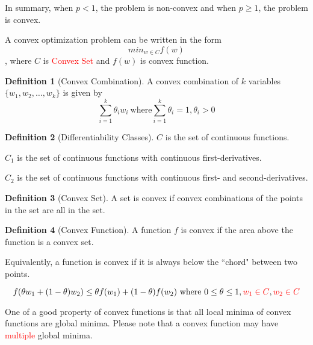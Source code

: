 \documentclass{article}
\theoremstyle{definition}
\newtheorem{definition}{Definition}[section]
\theoremstyle{remark}
\newcommand{\red}[1]{\textcolor{red}{#1}}
\begin{document}
In summary, when $p < 1$, the problem is non-convex and when $p \geq 1$, the problem is convex.

A convex optimization problem can be written in the form
\begin{equation}
    min_{w \in C}f(w)
\end{equation},
where $C$ is \textcolor{red}{Convex Set} and $f(w)$ is convex function.

\begin{definition}[Convex Combination]

A convex combination of $k$ variables $\{w_1, w_2, \dots, w_k\}$ is given by
\begin{equation}
    \sum_{i=1}^{k} \theta_{i}w_{i}\ \text{where} \sum_{i=1}^k \theta_{i} = 1, \theta_{i} > 0
\end{equation}
\end{definition}

\begin{definition}[Differentiability Classes]

$C$ is the set of continuous functions.

$C_1$ is the set of continuous functions with continuous first-derivatives.

$C_2$ is the set of continuous functions with continuous first- and second-derivatives.
\end{definition}

\begin{definition}[Convex Set]
A set is convex if convex combinations of the points in the set are all in the set.
\end{definition}

\begin{definition}[Convex Function]
A function $f$ is convex if the area above the function is a convex set.
\end{definition}

Equivalently, a function is convex if it is always below the ``chord" between two points.

\begin{equation}
    f(\theta w_1 + (1-\theta) w_2) \leq \theta f(w_1) + (1-\theta) f(w_2)\ \text{where}\ 0 \leq \theta \leq 1, \textcolor{red}{w_1 \in C}, \textcolor{red}{w_2 \in C}
\end{equation}

One of a good property of convex functions is that all local minima of convex functions are global minima. Please note that a convex function may have \red{multiple} global minima.
\end{document}
